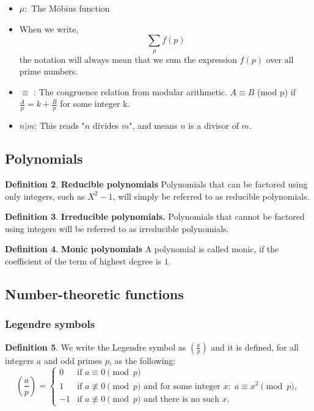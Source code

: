 \documentclass{article}
\theoremstyle{definition}
\newtheorem{definition}{Definition}[section]
\theoremstyle{remark}
\begin{document}
\begin{itemize}
\begin{definition}
$$|f(x)| \leq  C |g(x)|\text{ for all }x \text{ such that } \vert x-a\vert < x_0$$
\end{definition}
\item $\mu:$ The Möbius function
\item When we write,
$$\sum_pf(p)$$
the notation will always mean that we sum the expression $f(p)$ over all prime numbers.
\item $\equiv$ : The congruence relation from modular arithmetic. $A \equiv B $ (mod p) if $\frac{A}{p} = k + \frac{B}{p}$ for some integer k.
\item $n|m$: This reads "$n$ divides $m$", and means $n$ is a divisor of $m$.
\end{itemize}

\subsection{Polynomials}
\begin{definition}
\textbf{Reducible polynomials}
Polynomials that can be factored using only integers, such as $X^2-1$, will simply be referred to as reducible polynomials.
\end{definition}
\begin{definition}
\textbf{Irreducible polynomials.}
Polynomials that cannot be factored using integers will be referred to as irreducible polynomials.
\end{definition}
\begin{definition}
\textbf{Monic polynomials}
A polynomial is called monic, if the coefficient of the term of highest degree is $1$.
\end{definition}

\subsection{Number-theoretic functions}
\subsubsection{Legendre symbols}
\begin{definition}\label {defLegendre}
We write the Legendre symbol as $(\frac{a}{p})$ and it is defined, for all integers $a$ and odd primes $p$, as the following:
$$\left(\frac{a}{p}\right) = \begin{cases}
0  & \text{if } a \equiv 0\pmod{p} \\
1 & \text{if } a \not\equiv 0\pmod{p} \text{ and for some integer } x\colon\;a\equiv x^2\pmod{p},\\
-1 & \text{if } a \not\equiv 0\pmod{p} \text{ and there is no such } x.
\end{cases}$$
\end{definition}
\end{document}
